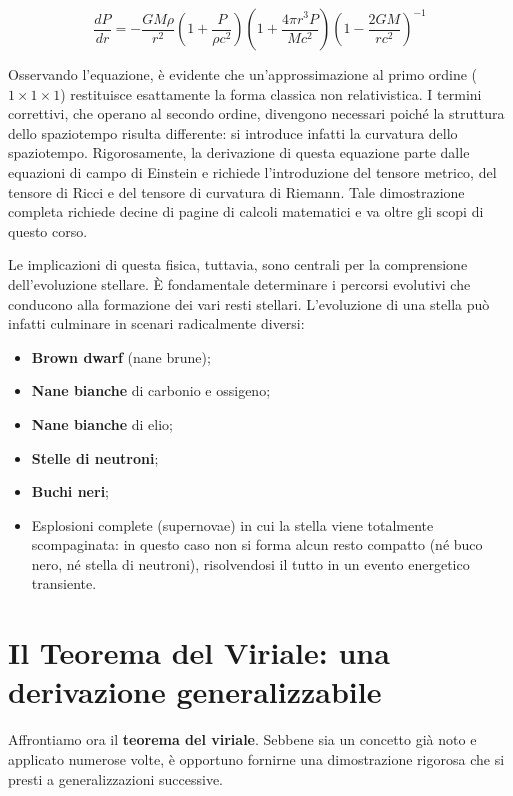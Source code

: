 \begin{equation}
\frac{dP}{dr} = -\frac{GM\rho}{r^2} \left( 1 + \frac{P}{\rho c^2} \right) \left( 1 + \frac{4\pi r^3 P}{M c^2} \right) \left( 1 - \frac{2GM}{rc^2} \right)^{-1}
\end{equation}

Osservando l'equazione, è evidente che un'approssimazione al primo ordine ($1 \times 1 \times 1$) restituisce esattamente la forma classica non relativistica. I termini correttivi, che operano al secondo ordine, divengono necessari poiché la struttura dello spaziotempo risulta differente: si introduce infatti la curvatura dello spaziotempo.
Rigorosamente, la derivazione di questa equazione parte dalle equazioni di campo di Einstein e richiede l'introduzione del tensore metrico, del tensore di Ricci e del tensore di curvatura di Riemann. Tale dimostrazione completa richiede decine di pagine di calcoli matematici e va oltre gli scopi di questo corso.

Le implicazioni di questa fisica, tuttavia, sono centrali per la comprensione dell'evoluzione stellare. È fondamentale determinare i percorsi evolutivi che conducono alla formazione dei vari resti stellari. L'evoluzione di una stella può infatti culminare in scenari radicalmente diversi:
\begin{itemize}
\item \textbf{Brown dwarf} (nane brune);
\item \textbf{Nane bianche} di carbonio e ossigeno;
\item \textbf{Nane bianche} di elio;
\item \textbf{Stelle di neutroni};
\item \textbf{Buchi neri};
\item Esplosioni complete (supernovae) in cui la stella viene totalmente scompaginata: in questo caso non si forma alcun resto compatto (né buco nero, né stella di neutroni), risolvendosi il tutto in un evento energetico transiente.
\end{itemize}

\section{Il Teorema del Viriale: una derivazione generalizzabile}

Affrontiamo ora il \textbf{teorema del viriale}. Sebbene sia un concetto già noto e applicato numerose volte, è opportuno fornirne una dimostrazione rigorosa che si presti a generalizzazioni successive.

